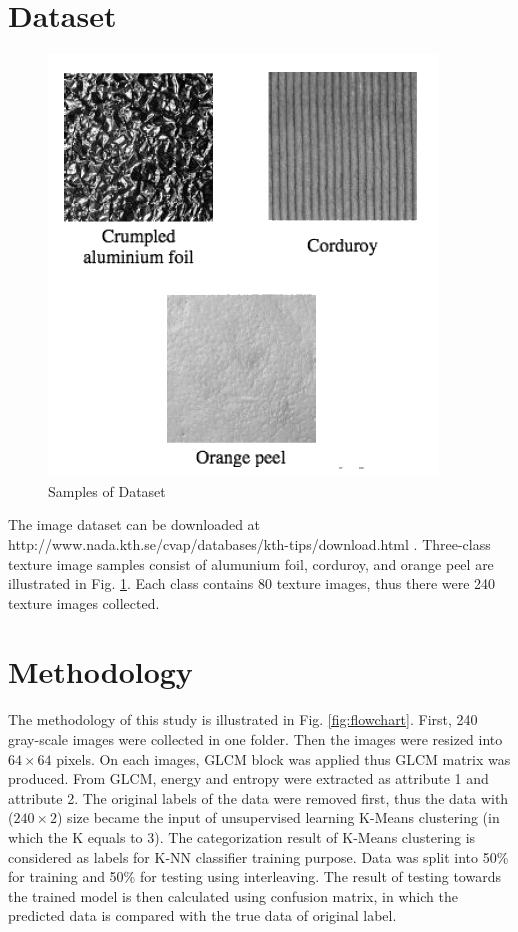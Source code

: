 \documentclass[conference]{IEEEtran}
\begin{document}
\section{Dataset}

\graphicspath{ {images/} }

\begin{figure}[!t]
\centering
\includegraphics[width=2.5 in]{texture_tugas.jpg}
\caption{Samples of Dataset}
\label{fig:texture_fig}
\end{figure}
The image dataset can be downloaded at http://www.nada.kth.se/cvap/databases/kth-tips/download.html \cite{KTH}. Three-class texture image samples consist of alumunium foil, corduroy, and orange peel are illustrated in Fig. \ref{fig:texture_fig}. Each class contains 80 texture images, thus there were 240 texture images collected. 

\section{Methodology}
The methodology of this study is illustrated in Fig. \ref{fig:flowchart}. First, 240 gray-scale images were collected in one folder. Then the images were resized into $64\times 64$ pixels. On each images, GLCM block was applied thus GLCM matrix was produced. From GLCM, energy and entropy were extracted as attribute 1 and attribute 2. The original labels of the data were removed first, thus the data with ($240\times2$) size became the input of unsupervised learning K-Means clustering (in which the K equals to 3). The categorization result of K-Means clustering is considered as labels for K-NN classifier training purpose. Data was split into 50\% for training and 50\% for testing using interleaving. The result of testing towards the trained model is then calculated using confusion matrix, in which the predicted data is compared with the true data of original label. 
\end{document}
